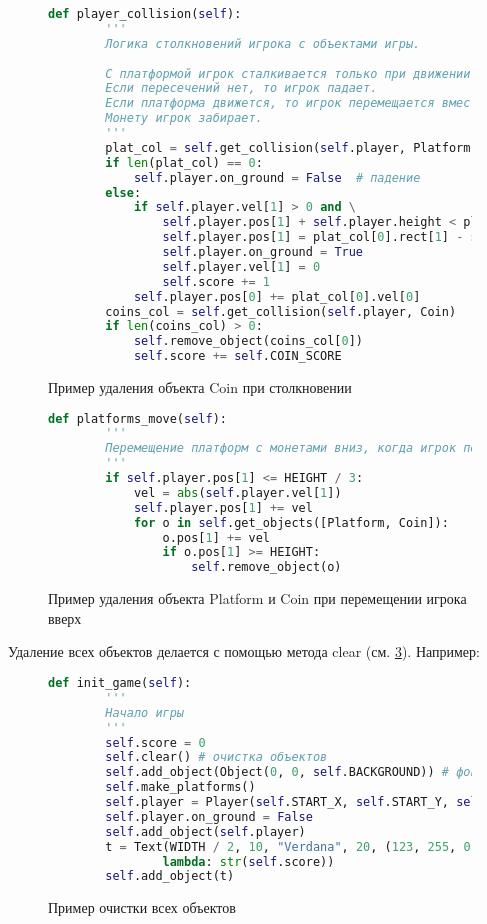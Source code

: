\begin{figure}[H]
	\begin{lstlisting}[language=Python]
	def player_collision(self):
		'''
		Логика столкновений игрока с объектами игры.
		
		С платформой игрок сталкивается только при движении вниз, и тогда он становится на нее, гравитация не действует.
		Если пересечений нет, то игрок падает.
		Если платформа движется, то игрок перемещается вместе с ней
		Монету игрок забирает.
		'''
		plat_col = self.get_collision(self.player, Platform)
		if len(plat_col) == 0:
			self.player.on_ground = False  # падение
		else:
			if self.player.vel[1] > 0 and \
				self.player.pos[1] + self.player.height < plat_col[0].pos[1] + plat_col[0].height:
				self.player.pos[1] = plat_col[0].rect[1] - self.player.height + 1
				self.player.on_ground = True
				self.player.vel[1] = 0
				self.score += 1
			self.player.pos[0] += plat_col[0].vel[0]
		coins_col = self.get_collision(self.player, Coin)
		if len(coins_col) > 0:
			self.remove_object(coins_col[0])
			self.score += self.COIN_SCORE
	\end{lstlisting}
	\caption{Пример удаления объекта Coin при столкновении}
	\label{removeobj:imgage}
\end{figure}

\begin{figure}[H]
	\begin{lstlisting}[language=Python]
	def platforms_move(self):
		'''
		Перемещение платформ с монетами вниз, когда игрок перемещается вверх
		'''
		if self.player.pos[1] <= HEIGHT / 3:
			vel = abs(self.player.vel[1])
			self.player.pos[1] += vel
			for o in self.get_objects([Platform, Coin]):
				o.pos[1] += vel
				if o.pos[1] >= HEIGHT:
					self.remove_object(o)
	\end{lstlisting}
	\caption{Пример удаления объекта Platform и Coin при перемещении игрока вверх}
	\label{removeobj2:imgage}
\end{figure}

Удаление всех объектов делается с помощью метода clear (см. \ref{removeall:imgage}). Например:

\begin{figure}[H]
	\begin{lstlisting}[language=Python]
	def init_game(self):
		'''
		Начало игры
		'''
		self.score = 0
		self.clear() # очистка объектов
		self.add_object(Object(0, 0, self.BACKGROUND)) # фон
		self.make_platforms()
		self.player = Player(self.START_X, self.START_Y, self.PLAYER)
		self.player.on_ground = False
		self.add_object(self.player)
		t = Text(WIDTH / 2, 10, "Verdana", 20, (123, 255, 0), \
				lambda: str(self.score))
		self.add_object(t)
	\end{lstlisting}
	\caption{Пример очистки всех объектов}
	\label{removeall:imgage}
\end{figure}

